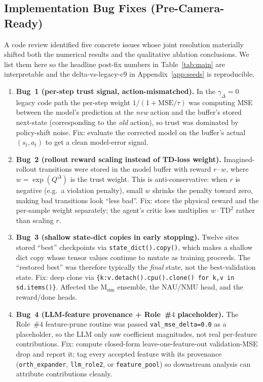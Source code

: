 \documentclass{article}
\theoremstyle{definition}
\newcommand{\QD}{Q^{\Delta}}
\begin{document}
\subsection{Implementation Bug Fixes (Pre-Camera-Ready)}
\label{sec:bugfixes}

A code review identified five concrete issues whose joint resolution
materially shifted both the numerical results and the qualitative
ablation conclusions.  We list them here so the headline
post-fix numbers in Table~\ref{tab:main} are interpretable and the
delta-vs-legacy-c9 in Appendix~\ref{app:seeds} is reproducible.

\begin{enumerate}
\item \textbf{Bug~1 (per-step trust signal, action-mismatched).}  In the
$\gamma_\Delta=0$ legacy code path the per-step weight
$1/(1+\mathrm{MSE}/\tau)$ was computing MSE between the model's
prediction at the \emph{new} action and the buffer's stored next-state
(corresponding to the \emph{old} action), so trust was dominated by
policy-shift noise.  Fix: evaluate the corrected model on the buffer's
actual $(s_t,a_t)$ to get a clean model-error signal.

\item \textbf{Bug~2 (rollout reward scaling instead of TD-loss
weight).}  Imagined-rollout transitions were stored in the model
buffer with reward $r\cdot w$, where $w=\exp(\QD)$ is the trust weight.
This is anti-conservative: when $r$ is negative (e.g.\ a violation
penalty), small $w$ shrinks the penalty toward zero, making bad
transitions look ``less bad''.  Fix: store the physical reward and the
per-sample weight separately; the agent's critic loss multiplies
$w\cdot\mathrm{TD}^2$ rather than scaling $r$.

\item \textbf{Bug~3 (shallow state-dict copies in early stopping).}
Twelve sites stored ``best'' checkpoints via
\texttt{state\_dict().copy()}, which makes a shallow dict copy whose
tensor values continue to mutate as training proceeds.  The
``restored best'' was therefore typically the \emph{final} state, not
the best-validation state.  Fix: deep clone via
\texttt{\{k:v.detach().cpu().clone() for k,v in sd.items()\}}.  Affected
the M$_{\mathrm{sim}}$ ensemble, the NAU/NMU head, and the reward/done
heads.

\item \textbf{Bug~4 (LLM-feature provenance + Role~\#$4$ placeholder).}
The Role~\#$4$ feature-prune routine was passed
\texttt{val\_mse\_delta=0.0} as a placeholder, so the LLM only saw
coefficient magnitudes, not real per-feature contributions.  Fix:
compute closed-form leave-one-feature-out validation-MSE drop and
report it; tag every accepted feature with its provenance
(\texttt{orth\_expander}, \texttt{llm\_role2}, or
\texttt{feature\_pool}) so downstream analysis can attribute
contributions cleanly.


\end{enumerate}
\end{document}

